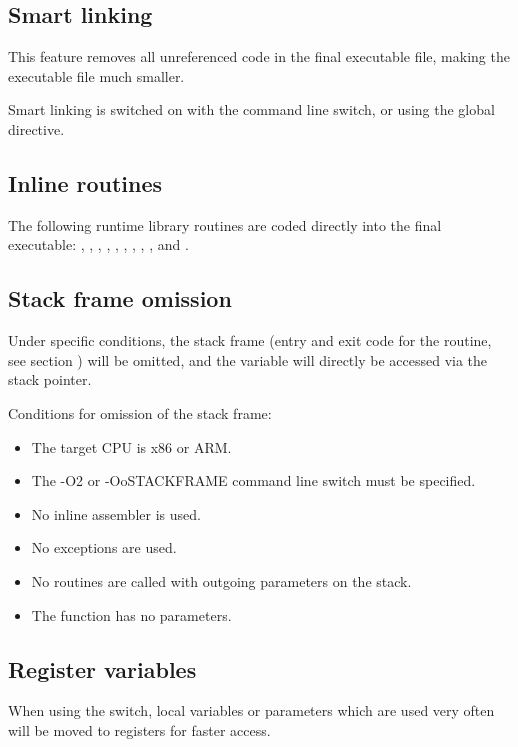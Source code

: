 \subsection{Smart linking}

This feature removes all unreferenced code in the final executable
file, making the executable file much smaller.

Smart linking is switched on with the  command line switch, or
using the  global directive.

\subsection{Inline routines}

The following runtime library routines are coded directly into the
final executable: , , , ,
, , , , ,
 and .

\subsection{Stack frame omission}

Under specific conditions, the stack frame (entry and exit code for
the routine, see section ) will be omitted, and the
variable will directly be accessed via the stack pointer.

Conditions for omission of the stack frame:
\begin{itemize}
\item The target CPU is x86 or ARM.
\item The -O2 or -OoSTACKFRAME command line switch must be specified.
\item No inline assembler is used.
\item No exceptions are used.
\item No routines are called with outgoing parameters on the stack.
\item The function has no parameters.
\end{itemize}

\subsection{Register variables}

When using the  switch, local variables or parameters
which are used very often will be moved to registers for faster
access.

